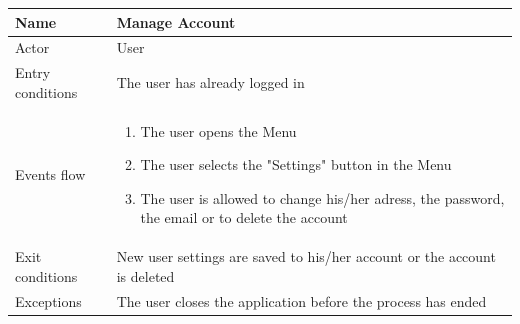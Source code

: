 \documentclass{article}
\begin{document}
\begin{table}[H]
    \begin{tabular}{|l|l|}
    \hline
    Name & \begin{minipage}[t]{0.7\textwidth} \textbf{Manage Account} \end{minipage} \\ \hline  
     Actor & \begin{minipage}[t]{0.7\textwidth} User \end{minipage} \\ \hline 
     Entry conditions & \begin{minipage}[t]{0.7\textwidth} The user has already logged in \end{minipage} \\
     \hline 
     Events flow & \begin{minipage}[t]{0.7\textwidth} 
    \begin{enumerate}
        \item The user opens the Menu
        \item The user selects the "Settings" button in the Menu
        \item The user is allowed to change his/her adress, the password, the
        email or to delete the account
    \end{enumerate}    
    \end{minipage} \\ \hline
     Exit conditions & \begin{minipage}[t]{0.7\textwidth} New user settings are
     saved to his/her account or the account is deleted \end{minipage} \\
     \hline
     Exceptions & \begin{minipage}[t]{0.7\textwidth} The user closes the
     application before the process has ended \end{minipage} \\ \hline
    \end{tabular}
\end{table}
\end{document}
